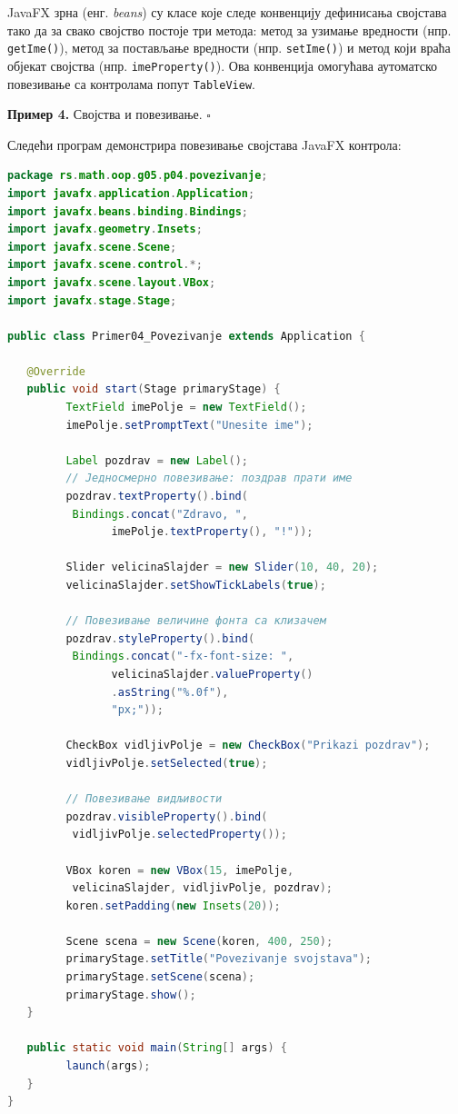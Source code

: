 JavaFX зрна (енг. \textit{beans}) су класе које следе конвенцију дефинисања својстава тако да за свако својство постоје три метода: метод за узимање вредности (нпр. \texttt{getIme()}), метод за постављање вредности (нпр. \texttt{setIme()}) и метод који враћа објекат својства (нпр. \texttt{imeProperty()}). Ова конвенција омогућава аутоматско повезивање са контролама попут \texttt{TableView}.


\bigskip

\noindent \textbf{Пример 4.} Својства и повезивање. $\square$

\medskip

Следећи програм демонстрира повезивање својстава JavaFX контрола:


\begin{lstlisting}[language=Java]
package rs.math.oop.g05.p04.povezivanje;
import javafx.application.Application;
import javafx.beans.binding.Bindings;
import javafx.geometry.Insets;
import javafx.scene.Scene;
import javafx.scene.control.*;
import javafx.scene.layout.VBox;
import javafx.stage.Stage;
 
public class Primer04_Povezivanje extends Application {
 
   @Override
   public void start(Stage primaryStage) {
         TextField imePolje = new TextField();
         imePolje.setPromptText("Unesite ime");
 
         Label pozdrav = new Label();
         // Једносмерно повезивање: поздрав прати име
         pozdrav.textProperty().bind(
          Bindings.concat("Zdravo, ",
                imePolje.textProperty(), "!"));
 
         Slider velicinaSlajder = new Slider(10, 40, 20);
         velicinaSlajder.setShowTickLabels(true);
 
         // Повезивање величине фонта са клизачем
         pozdrav.styleProperty().bind(
          Bindings.concat("-fx-font-size: ",
                velicinaSlajder.valueProperty()
                .asString("%.0f"),
                "px;"));
 
         CheckBox vidljivPolje = new CheckBox("Prikazi pozdrav");
         vidljivPolje.setSelected(true);
 
         // Повезивање видљивости
         pozdrav.visibleProperty().bind(
          vidljivPolje.selectedProperty());
 
         VBox koren = new VBox(15, imePolje,
          velicinaSlajder, vidljivPolje, pozdrav);
         koren.setPadding(new Insets(20));
 
         Scene scena = new Scene(koren, 400, 250);
         primaryStage.setTitle("Povezivanje svojstava");
         primaryStage.setScene(scena);
         primaryStage.show();
   }
 
   public static void main(String[] args) {
         launch(args);
   }
}
\end{lstlisting}


